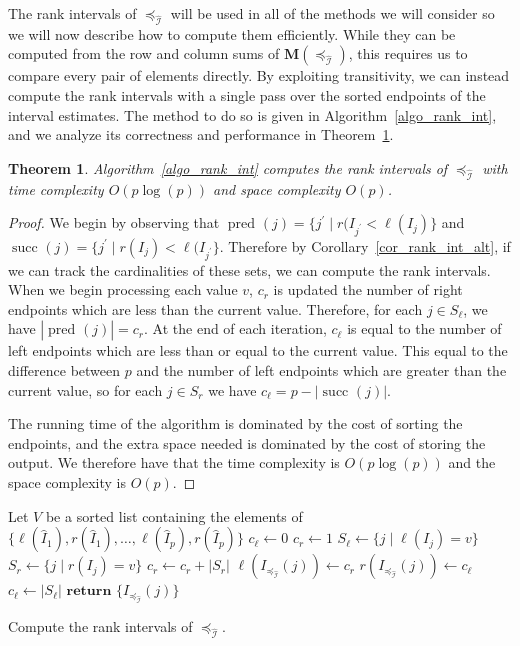 \documentclass[12pt]{article}
\newcommand{\return}[1]{\textbf{return }#1}
\newcommand{\mat}[1]{\mathbf{M}(#1)}
\newcommand{\pset}[2][]{\operatorname{pred}_{#1}(#2)}
\newcommand{\sset}[2][]{\operatorname{succ}_{#1}(#2)}
\newcommand{\iord}{{\preceq_{\hat{\mathcal{I}}}}}
\newtheorem{theorem}{Theorem}
\numberwithin{theorem}{section}
\begin{document}
The rank intervals of $\iord$ will be used in all of the methods we will consider so we will now describe how to compute them efficiently.  While they can be computed from the row and column sums of $\mat{\iord}$, this requires us to compare every pair of elements directly.  By exploiting transitivity, we can instead compute the rank intervals with a single pass over the sorted endpoints of the interval estimates.  The method to do so is given in Algorithm~\ref{algo_rank_int}, and we analyze its correctness and performance in Theorem~\ref{thm_algo_rank_int}.

\begin{theorem}
\label{thm_algo_rank_int}
Algorithm~\ref{algo_rank_int} computes the rank intervals of $\iord$ with time complexity $O(p\log(p))$ and space complexity $O(p)$.
\end{theorem}
\begin{proof}
We begin by observing that $\pset{j} = \{j^{'} \mid r(I_{j^{'}} < \ell(I_j)\}$ and $\sset{j} = \{j^{'} \mid r(I_j) < \ell(I_{j^{'}}\}$.  Therefore by Corollary~\ref{cor_rank_int_alt}, if we can track the cardinalities of these sets, we can compute the rank intervals.  When we begin processing each value $v$, $c_r$ is updated the number of right endpoints which are less than the current value.  Therefore, for each $j \in S_\ell$, we have $|\pset{j}| = c_r$.  At the end of each iteration, $c_\ell$ is equal to the number of left endpoints which are less than or equal to the current value.  This equal to the difference between $p$ and the number of left endpoints which are greater than the current value, so for each $j \in S_r$ we have $c_\ell = p - |\sset{j}|$.

The running time of the algorithm is dominated by the cost of sorting the endpoints, and the extra space needed is dominated by the cost of storing the output.  We therefore have that the time complexity is $O(p\log(p))$ and the space complexity is $O(p)$.
\end{proof}

\begin{algorithm}[t]
\begin{algorithmic}
  \State Let $V$ be a sorted list containing the elements of $\{\ell(\hat{I}_1), r(\hat{I}_1), \dots, \ell(\hat{I}_p), r(\hat{I}_p)\}$
  \State $c_\ell \gets 0$
  \State $c_r \gets 1$
    \State $S_\ell \gets \{j \mid \ell(I_j) = v\}$
    \State $S_r \gets \{j \mid r(I_j) = v\}$
    \State $c_r \gets c_r + |S_r|$
      \State $\ell(I_\iord(j)) \gets c_r$
    \EndFor
      \State $r(I_\iord(j)) \gets c_\ell$
    \EndFor
    \State $c_\ell \gets |S_\ell|$
  \EndFor
  \State $\return{\{I_\iord(j)\}}$
\EndProcedure
\end{algorithmic}
\caption{Compute the rank intervals of $\iord$.}
\label{algo_rank_int}
\end{algorithm}
\end{document}

